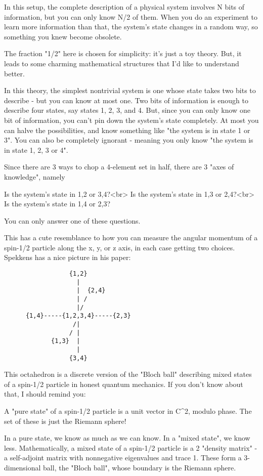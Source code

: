 In this setup, the complete description of a physical system involves
N bits of information, but you can only know N/2 of them.  When you do 
an experiment to learn more information than that, the system's state 
changes in a random way, so something you knew become obsolete.

The fraction "1/2" here is chosen for simplicity: it's just a toy 
theory.  But, it leads to some charming mathematical structures 
that I'd like to understand better.

In this theory, the simplest nontrivial system is one whose state
takes two bits to describe - but you can know at most one.  Two bits 
of information is enough to describe four states, say states 1, 2, 3, 
and 4.  But, since you can only know one bit of information, you can't 
pin down the system's state completely.  At most you can halve the 
possibilities, and know something like "the system is in state 1 or 3".  
You can also be completely ignorant - meaning you only know "the 
system is in state 1, 2, 3 or 4".

Since there are 3 ways to chop a 4-element set in half, there are 
3 "axes of knowledge", namely

Is the system's state in {1,2} or {3,4}?<br>
Is the system's state in {1,3} or {2,4}?<br>
Is the system's state in {1,4} or {2,3}?

You can only answer one of these questions.

This has a cute resemblance to how you can measure the angular
momentum of a spin-1/2 particle along the x, y, or z axis, in 
each case getting two choices.  Spekkens has a nice picture
in his paper:
 
\begin{verbatim}
                  {1,2}
                    |
                    |  {2,4}
                    | /
                    |/       
      {1,4}-----{1,2,3,4}-----{2,3}
                   /| 
                  / |
             {1,3}  |
                    |
                  {3,4} 
\end{verbatim}
    

This octahedron is a discrete version of the "Bloch ball" describing 
mixed states of a spin-1/2 particle in honest quantum mechanics.  If
you don't know about that, I should remind you:

A "pure state" of a spin-1/2 particle is a unit vector in
C^{2}, modulo phase.  The set of these is just the Riemann sphere!

In a pure state, we know as much as we can know.  In a "mixed state",
we know less.  Mathematically, a mixed state of a spin-1/2 particle 
is a 2 "density matrix" - a self-adjoint matrix with nonnegative 
eigenvalues and trace 1.  These form a 3-dimensional ball, the "Bloch 
ball", whose boundary is the Riemann sphere.  

